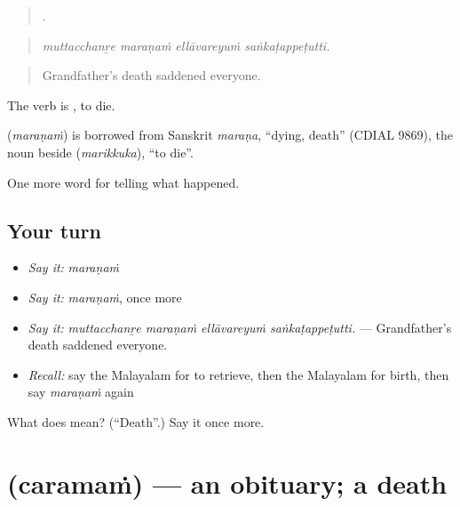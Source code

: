 \begin{quote}
   .
\end{quote}

\begin{quote}
\emph{muttacchanṟe maraṇaṁ ellāvareyuṁ saṅkaṭappeṭutti.}
\end{quote}

\begin{quote}
Grandfather's death saddened everyone.
\end{quote}

The verb is , to die.

\begin{cousinweb}
\textbf{} (\emph{maraṇaṁ}) is borrowed from Sanskrit \emph{maraṇa}, \textquotedblleft{}dying, death\textquotedblright{} (CDIAL 9869), the noun beside  (\emph{marikkuka}), \textquotedblleft{}to die\textquotedblright{}.
\end{cousinweb}

\begin{grammarlens}[title={What you've built}]
One more word for telling what happened.
\end{grammarlens}

\subsection*{Your turn}
\begin{itemize}
\raggedright
  \item \emph{Say it:} \emph{maraṇaṁ}
  \item \emph{Say it:} \emph{maraṇaṁ}, once more
  \item \emph{Say it:} \emph{muttacchanṟe maraṇaṁ ellāvareyuṁ saṅkaṭappeṭutti.} — Grandfather's death saddened everyone.
  \item \emph{Recall:} say the Malayalam for to retrieve, then the Malayalam for birth, then say \emph{maraṇaṁ} again
\end{itemize}

\begin{tcolorbox}[breakable,colback=teal!4,colframe=teal!35!black,title={Before you move on}]
What does  mean? (\textquotedblleft{}Death\textquotedblright{}.) Say it once more.
\end{tcolorbox}
\section[\texorpdfstring{\ml{ചരമം} (caramaṁ)}{ചരമം (caramaṁ)}]{ (caramaṁ) — an obituary; a death}

